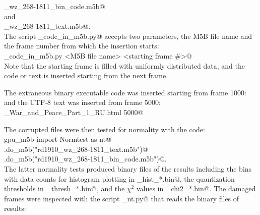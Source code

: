 \documentclass[letterpaper,twoside,12pt]{article}
\begin{document}
\noindent {}_wz_268-1811_bin_code.m5b@ \\
\indent and \\
\noindent {}_wz_268-1811_text.m5b@.  \\

The script \verb@insert_code_in_m5b.py@ accepts two parameters, the M5B file name and the frame number from which the insertion starts: \\

\noindent \verb@insert_code_in_m5b.py <M5B file name> <starting frame #>@ \\

Note that the starting frame is filled with uniformly distributed data, and the code or text is inserted starting from the next frame.

The extraneous binary executable code was inserted starting from frame 1000: \\
\noindent \verb@%run insert_code_in_m5b.py rd1910_wz_268-1811_bin_code.m5b code1.bin 1000@ \\
\indent and the UTF-8 text was inserted from frame 5000: \\
\noindent \verb@%run insert_code_in_m5b.py rd1910_wz_268-1811_text.m5b@ \verb@\@ \\
\indent \indent \indent \indent \indent \indent    \verb@Tolstoy_War_and_Peace_Part_1_RU.html 5000@

The corrupted files were then tested for normality with the code: \\

\noindent \verb@from gpu_m5b import Normtest as nt@ \\
\noindent \verb@nt.do_m5b("rd1910_wz_268-1811_text.m5b")@ \\
\noindent \verb@nt.do_m5b("rd1910_wz_268-1811_bin_code.m5b")@. \\

The latter normality tests produced binary files of the results including the bins with data counts for histogram plotting in \verb@nt_hist_*.bin@, the quantization thresholds in \verb@nt_thresh_*.bin@, and the $\chi^2$ values in \verb@nt_chi2_*.bin@. The damaged frames were inspected with the script \verb@inspect_nt.py@ that reads the binary files of results: \\

\noindent \verb@%run inspect_nt.py rd1910_wz_268-1811_bin_code.m5b 067  2000 1@ \\
\noindent \verb@%run inspect_nt.py rd1910_wz_268-1811_text.m5b 056  5006 1@. \\
\end{document}
